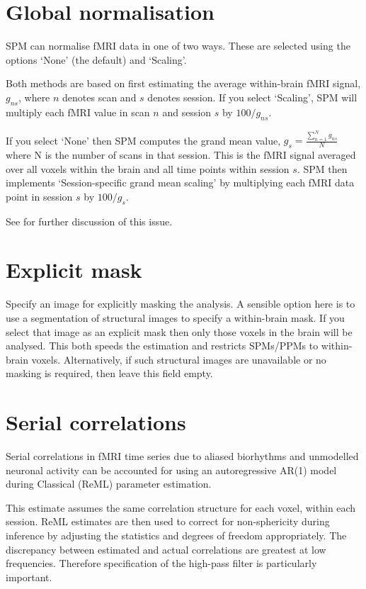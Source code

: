 \documentclass[a4paper,titlepage]{book}
\begin{document}
\section{Global normalisation}

SPM can normalise fMRI data in one of two ways. These are 
selected using the options `None' (the default) and `Scaling'. 

Both methods are based on first estimating the average within-brain fMRI signal, $g_{ns}$, where $n$ denotes scan and $s$ denotes session.
If you select `Scaling', SPM will multiply each fMRI value in scan $n$ and session $s$ by $100/g_{ns}$.

If you select `None' then SPM computes the grand mean value, $g_s=\frac{\sum_{n=1}^N g_{ns}}{N}$ where N is the number of scans in that 
session.
This is the fMRI signal averaged over all voxels within the brain and all time points within session $s$. SPM then implements `Session-specific grand mean scaling' by multiplying each fMRI data point in session $s$ by $100/g_s$. 
 
See \cite{ja_global} for further discussion of this issue.


\section{Explicit mask}
Specify an image for explicitly masking the analysis. A sensible option here is to use a segmentation of structural images to specify a within-brain mask. If you select that image as an explicit mask then only those voxels in the brain will be analysed. This both speeds the estimation and restricts SPMs/PPMs to within-brain voxels. Alternatively, if such structural images are unavailable or no masking is required, then leave this field empty.


\section{Serial correlations}
Serial correlations in fMRI time series due to aliased biorhythms and unmodelled neuronal activity can be accounted for using an autoregressive AR(1) model during Classical (ReML) parameter estimation.  

                                                                                                            

This estimate assumes the same correlation structure for each voxel, within each session.  ReML estimates are then used to correct for non-sphericity during inference by adjusting the statistics and degrees of freedom appropriately.  The discrepancy between estimated and actual correlations are greatest at low frequencies.  Therefore specification of the high-pass filter is particularly important. 
\end{document}
